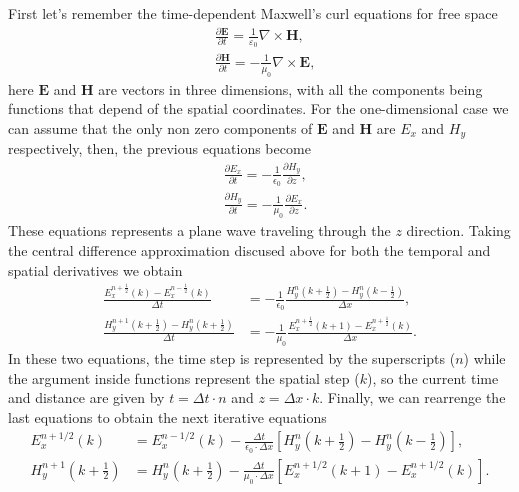 \documentclass[12pt, oneside]{book}
\begin{document}
First let's remember the time-dependent Maxwell's curl equations for free space \cite{jackson, griffiths}
\begin{align}
    &\frac{\partial \boldsymbol{E}}{\partial t}=\frac{1}{\varepsilon_{0}} \nabla \times \boldsymbol{H}, \\
    &\frac{\partial \boldsymbol{H}}{\partial t}=-\frac{1}{\mu_{0}} \nabla \times \boldsymbol{E},
\end{align}
here $\boldsymbol{E}$ and $\boldsymbol{H}$ are vectors in three dimensions, with all the components being functions that depend of the spatial coordinates. For the one-dimensional case we can assume that the only non zero components of $\boldsymbol{E}$ and $\boldsymbol{H}$ are $E_x$ and $H_y$ respectively, then, the previous equations become
\begin{align}
    & \frac{\partial E_x}{\partial t}=-\frac{1}{\epsilon_0}  \frac{\partial H_y}{\partial z}, \\
    & \frac{\partial H_y}{\partial t}=-\frac{1}{\mu_0} \frac{\partial E_x}{\partial z}.
\end{align}
These equations represents a plane wave traveling through the $z$ direction. Taking the central difference approximation discused above for both the temporal and spatial derivatives we obtain \cite{Sullivan2020}
\begin{align}
    \frac{E_x^{n+\frac{1}{2}}(k)-E_x^{n-\frac{1}{2}}(k)}{\Delta t} &=-\frac{1}{\epsilon_0}\frac{H_y^n \left(k+\frac{1}{2}\right) - H_y^n\left(k-\frac{1}{2}\right)}{\Delta x}, \\
    \frac{H_y^{n+1} \left(k+\frac{1}{2}\right) -H_y^{n}\left( k +\frac{1}{2}\right)}{\Delta t} &=-\frac{1}{\mu_0}\frac{E_x^{n+\frac{1}{2}} \left(k+1\right) - E_x^{n+\frac{1}{2}}\left(k\right)}{\Delta x}.
\end{align}
In these two equations, the time step is represented by the superscripts ($n$) while the argument inside functions represent the spatial step ($k$), so the current time and distance are given by $t = \Delta t \cdot n$ and $z = \Delta x \cdot k$. Finally, we can rearrenge the last equations to obtain the next iterative equations
\begin{align}
    E_{x}^{n+1 / 2}(k) &=E_{x}^{n-1 / 2}(k)-\frac{\Delta t}{\epsilon_{0} \cdot \Delta x}\left[H_{y}^{n}\left(k+\frac{1}{2}\right)-H_{y}^{n}\left(k-\frac{1}{2}\right)\right], \\
    H_{y}^{n+1}\left(k+\frac{1}{2}\right) &=H_{y}^{n}\left(k+\frac{1}{2}\right)-\frac{\Delta t}{\mu_{0} \cdot \Delta x}\left[E_{x}^{n+1 / 2}(k+1)-E_{x}^{n+1 / 2}(k)\right].
\end{align}
\end{document}
